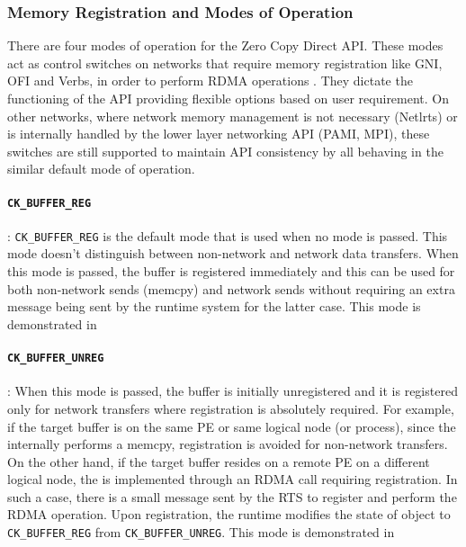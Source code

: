 \subsubsection{Memory Registration and Modes of Operation}

There are four modes of operation for the Zero Copy Direct API. These modes
act as control switches on networks that require memory registration like GNI,
OFI and Verbs, in order to perform RDMA operations . They dictate the functioning of the API
providing flexible options based on user requirement. On other networks, where
network memory management is not necessary (Netlrts) or is internally handled by the lower
layer networking API (PAMI, MPI), these switches are still supported to maintain API
consistency by all behaving in the similar default mode of operation.

\paragraph{{\tt CK\_BUFFER\_REG}}:
{\tt CK\_BUFFER\_REG} is the default mode that
is used when no mode is passed. This mode doesn't distinguish between
non-network and network data transfers. When this mode is passed, the buffer
is registered immediately and this can be used for both non-network sends (memcpy)
and network sends without requiring an extra message being sent by the runtime system
for the latter case. This mode is demonstrated in

\paragraph{{\tt CK\_BUFFER\_UNREG}}:
When this mode is passed, the buffer is initially unregistered and it is
registered only for network transfers where registration is absolutely required.
For example, if the target buffer is on the same PE or same logical node (or process),
since the  internally performs a memcpy, registration is avoided for non-network
transfers. On the other hand, if the target buffer resides on a remote PE on a different
logical node, the  is implemented through an RDMA call requiring registration.
In such a case, there is a small message sent by the RTS to register and perform
the RDMA operation. Upon registration, the runtime modifies the state of 
object to {\tt CK\_BUFFER\_REG} from {\tt CK\_BUFFER\_UNREG}. This mode is demonstrated in

